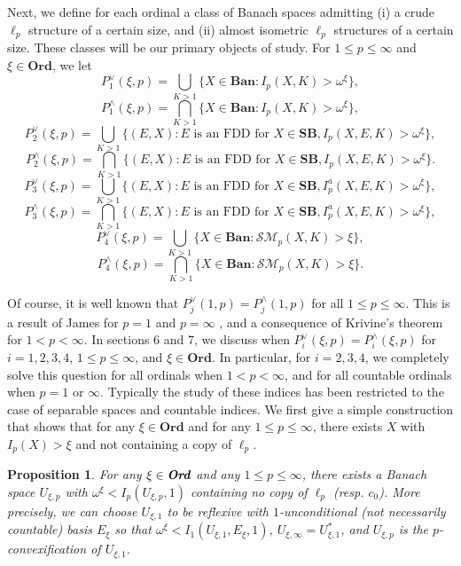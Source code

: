 \documentclass[12pt]{amsart}
\newtheorem{proposition}[theorem]{Proposition}
\theoremstyle{definition}
\newcommand{\ord}{\textbf{Ord}}
\newcommand{\ssm}{\mathcal{SM}}
\begin{document}
Next, we define for each ordinal a class of Banach spaces admitting (i) a crude $\ell_p$ structure of a certain size, and (ii) almost isometric $\ell_p$ structures of a certain size.  These classes will be our primary objects of study.    For $1\leqslant p\leqslant \infty$ and $\xi\in \ord$, we let $$P_1^\vee(\xi, p)=\bigcup_{K>1}\{X\in \textbf{Ban}: I_p(X,K)>\omega^\xi\},$$ $$ P_1^\wedge(\xi, p) = \bigcap_{K>1} \{X\in \textbf{Ban}: I_p(X, K)>\omega^\xi\},$$ $$P_2^\vee(\xi, p)=\bigcup_{K>1}\{(E,X):E\text{\ is an FDD for\ }X\in \textbf{SB}, I_p(X,E,K)>\omega^\xi\},$$ $$ P_2^\wedge(\xi, p) = \bigcap_{K>1} \{(E,X):E \text{\ is an FDD for\ }X\in \textbf{SB}, I_p(X,E, K)>\omega^\xi\}.$$  $$P_3^\vee(\xi, p)=\bigcup_{K>1}\{(E,X):E\text{\ is an FDD for\ }X\in \textbf{SB}, I_p^a(X,E,K)>\omega^\xi\},$$ $$ P_3^\wedge(\xi, p) = \bigcap_{K>1} \{(E,X):E \text{\ is an FDD for\ }X\in \textbf{SB}, I_p^a(X,E, K)>\omega^\xi\},$$ $$P^\vee_4(\xi,p)=\bigcup_{K>1}\{X\in \textbf{Ban}: \ssm_p(X, K)>\xi\},$$ $$P^\wedge_4(\xi, p)=\bigcap_{K>1}\{X\in \textbf{Ban}: \ssm_p(X, K)>\xi\}.$$


Of course, it is well known that $P^\vee_j(1,p)=P^\wedge_j(1,p)$ for all $1\leqslant p\leqslant \infty$.  This is a result of James for $p=1 $ and $p=\infty$ \cite{James}, and a consequence of Krivine's theorem \cite{K} for $1<p<\infty$.  In sections 6 and 7, we discuss when $P^\vee_i(\xi, p)=P^\wedge_i(\xi, p)$ for $i=1,2,3,4$, $1\leqslant p\leqslant \infty$, and $\xi\in \ord$.  In particular, for $i=2,3,4$, we completely solve this question for all ordinals when $1<p<\infty$, and for all countable ordinals when $p=1$ or $\infty$.  Typically the study of these indices has been restricted to the case of separable spaces and countable indices.  We first give a simple construction that shows that for any $\xi\in \ord$ and for any $1\leqslant p\leqslant \infty$, there exists $X$ with $I_p(X)>\xi$ and not containing a copy of $\ell_p$.  



\begin{proposition} For any $\xi\in \emph{\ord}$ and any $1\leqslant p\leqslant \infty$, there exists a Banach space $U_{\xi,p}$ with $\omega^\xi<I_p(U_{\xi,p}, 1)$ containing no copy of $\ell_p$ (resp. $c_0$).  More precisely, we can choose $U_{\xi,1}$ to be reflexive with $1$-unconditional (not necessarily countable) basis $E_\xi$ so that $\omega^\xi< I_1(U_{\xi,1}, E_\xi, 1)$, $U_{\xi, \infty}=U_{\xi, 1}^*$, and $U_{\xi, p}$ is the $p$-convexification of $U_{\xi, 1}$.  

\label{high examples}
 


\end{proposition}
\end{document}

